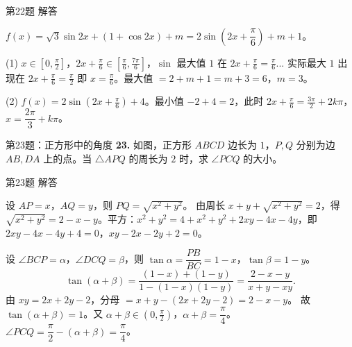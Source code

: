 \documentclass[10pt,aspectratio=169,serif]{beamer}
\begin{document}
\begin{frame}[t]{第22题 解答}
\begin{tcolorbox}[colback=orange!10,colframe=orange,title=\textbf{解}]
$f(x)=\sqrt3\sin 2x+(1+\cos 2x)+m=2\sin\!\left(2x+\dfrac{\pi}{6}\right)+m+1$。

(1) $x\in[0,\frac{\pi}{2}]$，$2x+\frac{\pi}{6}\in[\frac{\pi}{6},\frac{7\pi}{6}]$，$\sin$ 最大值 $1$ 在 $2x+\frac{\pi}{6}=\frac{\pi}{6}$... 实际最大 $1$ 出现在 $2x+\frac{\pi}{6}=\frac{\pi}{2}$ 即 $x=\frac{\pi}{6}$。最大值 $=2+m+1=m+3=6$，$m=3$。

(2) $f(x)=2\sin(2x+\frac{\pi}{6})+4$。最小值 $-2+4=2$，此时 $2x+\frac{\pi}{6}=\frac{3\pi}{2}+2k\pi$，$x=\dfrac{2\pi}{3}+k\pi$。
\end{tcolorbox}
\end{frame}

\begin{frame}[t]{第23题：正方形中的角度}
\textbf{23.} 如图，正方形 $ABCD$ 边长为 $1$，$P,Q$ 分别为边 $AB,DA$ 上的点。当 $\triangle APQ$ 的周长为 $2$ 时，求 $\angle PCQ$ 的大小。

\begin{center}
\end{center}
\end{frame}

\begin{frame}[t]{第23题 解答}
\begin{tcolorbox}[colback=orange!10,colframe=orange,title=\textbf{解}]
设 $AP=x$，$AQ=y$，则 $PQ=\sqrt{x^2+y^2}$。
由周长 $x+y+\sqrt{x^2+y^2}=2$，得 $\sqrt{x^2+y^2}=2-x-y$。平方：$x^2+y^2=4+x^2+y^2+2xy-4x-4y$，即 $2xy-4x-4y+4=0$，$xy-2x-2y+2=0$。

设 $\angle BCP=\alpha$，$\angle DCQ=\beta$，则 $\tan\alpha=\dfrac{PB}{BC}=1-x$，$\tan\beta=1-y$。
\[
\tan(\alpha+\beta)=\frac{(1-x)+(1-y)}{1-(1-x)(1-y)}=\frac{2-x-y}{x+y-xy}.
\]
由 $xy=2x+2y-2$，分母 $=x+y-(2x+2y-2)=2-x-y$。
故 $\tan(\alpha+\beta)=1$。又 $\alpha+\beta\in(0,\frac{\pi}{2})$，$\alpha+\beta=\dfrac{\pi}{4}$。
$\angle PCQ=\dfrac{\pi}{2}-(\alpha+\beta)=\dfrac{\pi}{4}$。
\end{tcolorbox}
\end{frame}
\end{document}
